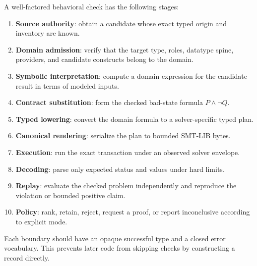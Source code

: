 \documentclass[10pt,letterpaper,oneside]{report}
\newcommand{\term}[1]{\textbf{#1}}
\begin{document}
A well-factored behavioral check has the following stages:

\begin{enumerate}
\item \term{Source authority}: obtain a candidate whose exact typed origin and inventory are known.
\item \term{Domain admission}: verify that the target type, roles, datatype spine, providers, and candidate constructs belong to the domain.
\item \term{Symbolic interpretation}: compute a domain expression for the candidate result in terms of modeled inputs.
\item \term{Contract substitution}: form the checked bad-state formula $P\land\neg Q$.
\item \term{Typed lowering}: convert the domain formula to a solver-specific typed plan.
\item \term{Canonical rendering}: serialize the plan to bounded SMT-LIB bytes.
\item \term{Execution}: run the exact transaction under an observed solver envelope.
\item \term{Decoding}: parse only expected status and values under hard limits.
\item \term{Replay}: evaluate the checked problem independently and reproduce the violation or bounded positive claim.
\item \term{Policy}: rank, retain, reject, request a proof, or report inconclusive according to explicit mode.
\end{enumerate}

Each boundary should have an opaque successful type and a closed error vocabulary. This prevents later code from skipping checks by constructing a record directly.
\end{document}
